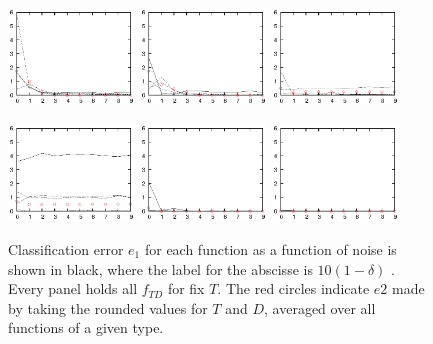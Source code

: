 \documentclass[useAMS,usenatbib]{mn2e}
\begin{document}
\begin{figure}
  \begin{center}
   \includegraphics[width=0.3\textwidth]{fig/err/ea1.eps}
   \includegraphics[width=0.3\textwidth]{fig/err/ea2.eps}
   \includegraphics[width=0.3\textwidth]{fig/err/ea3.eps}
  \end{center}
  \begin{center}
   \includegraphics[width=0.3\textwidth]{fig/err/ea4.eps}
   \includegraphics[width=0.3\textwidth]{fig/err/ea5.eps}
   \includegraphics[width=0.3\textwidth]{fig/err/ea6.eps}
  \end{center}
  \caption{\label{fig:e12a}Classification error $e_1$ for each
    function as a function of noise is shown in black, where the label
    for the abscisse is $10(1-\delta)$ . Every panel holds all
    $f_{TD}$ for fix $T$. The red circles indicate $e2$ made by taking
    the rounded values for $T$ and $D$, averaged over all functions of
    a given type.}
\end{figure}
\end{document}
